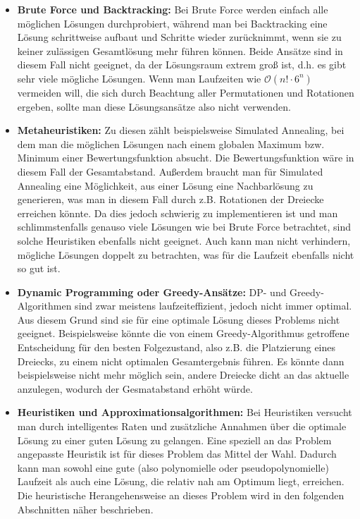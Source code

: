 \documentclass[a4paper, notitlepage, 12pt]{scrartcl}
\begin{document}
 \begin{itemize}
 	\item \textbf{Brute Force und Backtracking:} Bei Brute Force werden einfach alle möglichen Lösungen durchprobiert, während man bei Backtracking eine Lösung schrittweise aufbaut und Schritte wieder zurücknimmt, wenn sie zu keiner zulässigen Gesamtlösung mehr führen können. Beide Ansätze sind in diesem Fall nicht geeignet, da der Lösungsraum extrem groß ist, d.h. es gibt sehr viele mögliche Lösungen. Wenn man Laufzeiten wie $\mathcal{O}(n! \cdot 6^n)$ vermeiden will, die sich durch Beachtung aller Permutationen und Rotationen ergeben, sollte man diese Lösungsansätze also nicht verwenden.
 	\item \textbf{Metaheuristiken:} Zu diesen zählt beispielsweise Simulated Annealing, bei dem man die möglichen Lösungen nach einem globalen Maximum bzw. Minimum einer Bewertungsfunktion absucht. Die Bewertungsfunktion wäre in diesem Fall der Gesamtabstand. Außerdem braucht man für Simulated Annealing eine Möglichkeit, aus einer Lösung eine Nachbarlösung zu generieren, was man in diesem Fall durch z.B. Rotationen der Dreiecke erreichen könnte. Da dies jedoch schwierig zu implementieren ist und man schlimmstenfalls genauso viele Lösungen wie bei Brute Force betrachtet, sind solche Heuristiken ebenfalls nicht geeignet. Auch kann man nicht verhindern, mögliche Lösungen doppelt zu betrachten, was für die Laufzeit ebenfalls nicht so gut ist.
 	\item \textbf{Dynamic Programming oder Greedy-Ansätze:} DP- und Greedy-Algorithmen sind zwar meistens laufzeiteffizient, jedoch nicht immer optimal. Aus diesem Grund sind sie für eine optimale Lösung dieses Problems nicht geeignet. Beispielsweise könnte die von einem Greedy-Algorithmus getroffene Entscheidung für den besten Folgezustand, also z.B. die Platzierung eines Dreiecks, zu einem nicht optimalen Gesamtergebnis führen. Es könnte dann beispielsweise nicht mehr möglich sein, andere Dreiecke dicht an das aktuelle anzulegen, wodurch der Gesmatabstand erhöht würde.
 	\item \textbf{Heuristiken und Approximationsalgorithmen:} Bei Heuristiken versucht man durch intelligentes Raten und zusätzliche Annahmen über die optimale Lösung zu einer guten Lösung zu gelangen. Eine speziell an das Problem angepasste Heuristik ist für dieses Problem das Mittel der Wahl. Dadurch kann man sowohl eine gute (also polynomielle oder pseudopolynomielle) Laufzeit als auch eine Lösung, die relativ nah am Optimum liegt, erreichen. Die heuristische Herangehensweise an dieses Problem wird in den folgenden Abschnitten näher beschrieben.
 \end{itemize}
\end{document}
